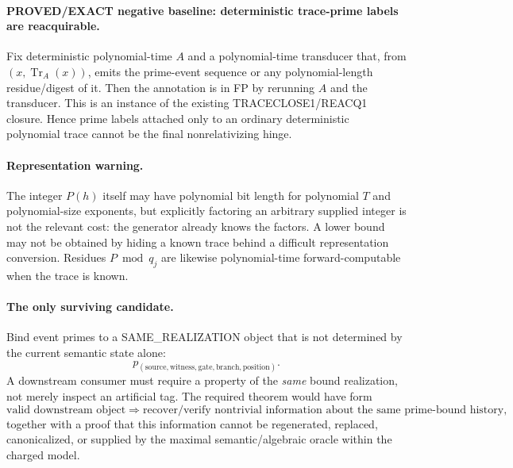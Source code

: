 \documentclass[11pt]{article}
\begin{document}
\paragraph{PROVED/EXACT negative baseline: deterministic trace-prime labels are reacquirable.}
Fix deterministic polynomial-time $A$ and a polynomial-time transducer that, from $(x,\operatorname{Tr}_A(x))$, emits the prime-event sequence or any polynomial-length residue/digest of it. Then the annotation is in FP by rerunning $A$ and the transducer. This is an instance of the existing TRACECLOSE1/REACQ1 closure. Hence prime labels attached only to an ordinary deterministic polynomial trace cannot be the final nonrelativizing hinge.

\paragraph{Representation warning.}
The integer $P(h)$ itself may have polynomial bit length for polynomial $T$ and polynomial-size exponents, but explicitly factoring an arbitrary supplied integer is not the relevant cost: the generator already knows the factors. A lower bound may not be obtained by hiding a known trace behind a difficult representation conversion. Residues $P\bmod q_j$ are likewise polynomial-time forward-computable when the trace is known.

\paragraph{The only surviving candidate.}
Bind event primes to a SAME\_REALIZATION object that is not determined by the current semantic state alone:
\[
p_{(\mathrm{source},\mathrm{witness},\mathrm{gate},\mathrm{branch},\mathrm{position})}.
\]
A downstream consumer must require a property of the \emph{same} bound realization, not merely inspect an artificial tag. The required theorem would have form
\[
\text{valid downstream object}\Rightarrow
\text{recover/verify nontrivial information about the same prime-bound history},
\]
together with a proof that this information cannot be regenerated, replaced, canonicalized, or supplied by the maximal semantic/algebraic oracle within the charged model.
\end{document}

